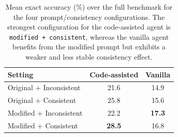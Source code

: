 \begin{table}[t]
\centering
\small
\begin{tabular}{lcc}
\hline
\textbf{Setting} & \textbf{Code-assisted} & \textbf{Vanilla} \\
\hline
Original + Inconsistent & 21.6 & 14.9 \\
Original + Consistent & 25.8 & 15.6 \\
Modified + Inconsistent & 22.2 & \textbf{17.3} \\
Modified + Consistent & \textbf{28.5} & 16.8 \\
\hline
\end{tabular}
\caption{Mean exact accuracy (\%) over the full benchmark for the four prompt/consistency configurations. The strongest configuration for the code-assisted agent is \texttt{modified + consistent}, whereas the vanilla agent benefits from the modified prompt but exhibits a weaker and less stable consistency effect.}
\label{tab:prompt-consistency-main}
\end{table}
